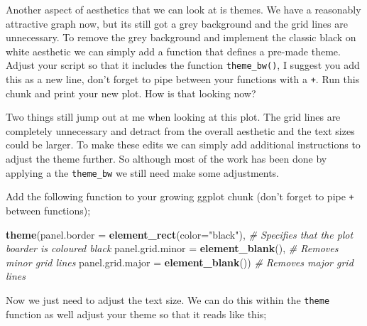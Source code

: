 \documentclass[
]{book}
\newenvironment{Shaded}{\begin{snugshade}}{\end{snugshade}}
\newcommand{\AttributeTok}[1]{\textcolor[rgb]{0.13,0.29,0.53}{#1}}
\newcommand{\CommentTok}[1]{\textcolor[rgb]{0.56,0.35,0.01}{\textit{#1}}}
\newcommand{\FunctionTok}[1]{\textcolor[rgb]{0.13,0.29,0.53}{\textbf{#1}}}
\newcommand{\NormalTok}[1]{#1}
\newcommand{\StringTok}[1]{\textcolor[rgb]{0.31,0.60,0.02}{#1}}
\begin{document}
Another aspect of aesthetics that we can look at is themes. We have a reasonably attractive graph now, but its still got a grey background and the grid lines are unnecessary. To remove the grey background and implement the classic black on white aesthetic we can simply add a function that defines a pre-made theme. Adjust your script so that it includes the function \texttt{theme\_bw()}, I suggest you add this as a new line, don't forget to pipe between your functions with a \texttt{+}. Run this chunk and print your new plot. How is that looking now?

Two things still jump out at me when looking at this plot. The grid lines are completely unnecessary and detract from the overall aesthetic and the text sizes could be larger. To make these edits we can simply add additional instructions to adjust the theme further. So although most of the work has been done by applying a the \texttt{theme\_bw} we still need make some adjustments.

Add the following function to your growing ggplot chunk (don't forget to pipe \texttt{+} between functions);

\begin{Shaded}
\begin{Highlighting}[]
\FunctionTok{theme}\NormalTok{(}\AttributeTok{panel.border =} \FunctionTok{element\_rect}\NormalTok{(}\AttributeTok{color=}\StringTok{"black"}\NormalTok{), }\CommentTok{\# Specifies that the plot boarder is coloured black}
        \AttributeTok{panel.grid.minor =} \FunctionTok{element\_blank}\NormalTok{(), }\CommentTok{\# Removes minor grid lines }
        \AttributeTok{panel.grid.major =} \FunctionTok{element\_blank}\NormalTok{()) }\CommentTok{\# Removes major grid lines }
\end{Highlighting}
\end{Shaded}

Now we just need to adjust the text size. We can do this within the \texttt{theme} function as well adjust your theme so that it reads like this;
\end{document}
